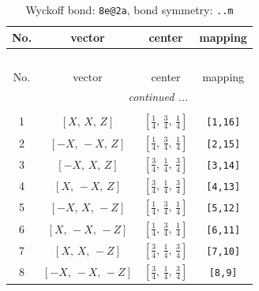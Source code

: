 \documentclass[fleqn,8pt]{jsarticle}
\begin{document}
\begin{longtable}{cccc}
\caption{Wyckoff bond: {\tt 8e@2a}, bond symmetry: {\tt ..m}}
 \\
 \hline \hline
No. & vector & center & mapping \\ \hline \endfirsthead

\multicolumn{3}{l}{\tablename\ \thetable{}} \\
 \hline \hline
No. & vector & center & mapping \\ \hline \endhead

 \hline \hline
\multicolumn{3}{r}{\footnotesize\it continued ...} \\ \endfoot

 \hline \hline
\multicolumn{3}{r}{} \\ \endlastfoot

1 & $\left[ X,\, X,\, Z \right]$ & $\left[ \frac{1}{4},\, \frac{3}{4},\, \frac{1}{4} \right]$ & {\tt [1,16]} \\ \hline
2 & $\left[ - X,\, - X,\, Z \right]$ & $\left[ \frac{1}{4},\, \frac{3}{4},\, \frac{1}{4} \right]$ & {\tt [2,15]} \\ \hline
3 & $\left[ - X,\, X,\, Z \right]$ & $\left[ \frac{3}{4},\, \frac{1}{4},\, \frac{3}{4} \right]$ & {\tt [3,14]} \\ \hline
4 & $\left[ X,\, - X,\, Z \right]$ & $\left[ \frac{3}{4},\, \frac{1}{4},\, \frac{3}{4} \right]$ & {\tt [4,13]} \\ \hline
5 & $\left[ - X,\, X,\, - Z \right]$ & $\left[ \frac{1}{4},\, \frac{3}{4},\, \frac{1}{4} \right]$ & {\tt [5,12]} \\ \hline
6 & $\left[ X,\, - X,\, - Z \right]$ & $\left[ \frac{1}{4},\, \frac{3}{4},\, \frac{1}{4} \right]$ & {\tt [6,11]} \\ \hline
7 & $\left[ X,\, X,\, - Z \right]$ & $\left[ \frac{3}{4},\, \frac{1}{4},\, \frac{3}{4} \right]$ & {\tt [7,10]} \\ \hline
8 & $\left[ - X,\, - X,\, - Z \right]$ & $\left[ \frac{3}{4},\, \frac{1}{4},\, \frac{3}{4} \right]$ & {\tt [8,9]} \\
\end{longtable}
\renewcommand{\arraystretch}{1.2}
\end{document}
